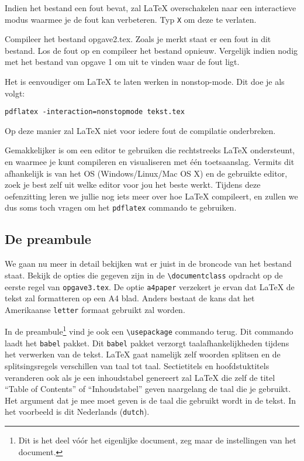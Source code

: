\documentclass[12pt, dutch]{article}
\newcommand{\bs}{\textbackslash}
\begin{document}
Indien het bestand een fout bevat, zal \LaTeX{} overschakelen naar een
interactieve modus waarmee je de fout kan verbeteren. Typ \texttt{X} om deze te
verlaten.

\begin{tcolorbox}[title=Opgave 2]
  Compileer het bestand opgave2.tex. Zoals je merkt staat er een fout in dit
  bestand. Los de fout op en compileer het bestand opnieuw. Vergelijk indien nodig
  met het bestand van opgave 1 om uit te vinden waar de fout ligt.
\end{tcolorbox}
Het is eenvoudiger om \LaTeX{} te laten werken in nonstop-mode. Dit doe je als volgt:
\begin{center} \verb'pdflatex -interaction=nonstopmode tekst.tex' \end{center}
Op deze manier zal \LaTeX{} niet voor iedere fout de compilatie onderbreken.



Gemakkelijker is om een editor te gebruiken die rechtstreeks \LaTeX{} ondersteunt,
en waarmee je kunt compileren en visualiseren met \'e\'en toetsaanslag.
Vermits dit afhankelijk is van het OS (Windows/Linux/Mac OS X) en de gebruikte
editor, zoek je best zelf uit welke editor voor jou het beste werkt. Tijdens
deze oefenzitting leren we jullie nog iets meer over hoe \LaTeX{} compileert, en
zullen we dus soms toch vragen om het \texttt{pdflatex} commando te gebruiken.

\subsection{De preambule}
We gaan nu meer in detail bekijken wat er juist in de broncode van het bestand
staat. Bekijk de opties die gegeven zijn in de \texttt{\bs{}documentclass}
opdracht op de eerste regel van \texttt{opgave3.tex}. De optie \texttt{a4paper} verzekert je ervan dat
\LaTeX{} de tekst zal formatteren op een A4 blad. Anders bestaat de kans dat
het Amerikaanse \texttt{letter} formaat gebruikt zal worden.

In de preambule\footnote{Dit is het deel vóór het eigenlijke
  document, zeg maar de instellingen van het document.} vind je ook
een \texttt{\bs{}usepackage} commando terug. Dit commando laadt het
\texttt{babel} pakket. Dit \texttt{babel} pakket verzorgt taalafhankelijkheden
tijdens het verwerken van de tekst. \LaTeX{} gaat namelijk zelf
woorden splitsen en de splitsingsregels verschillen van taal tot
taal. Sectietitels en hoofdstuktitels veranderen ook als je een
inhoudstabel genereert zal \LaTeX{} die zelf de titel ``Table of
Contents'' of ``Inhoudstabel'' geven naargelang de taal die je
gebruikt. Het argument dat je mee moet geven is de taal die gebruikt
wordt in de tekst. In het voorbeeld is dit Nederlands (\texttt{dutch}).
\end{document}
